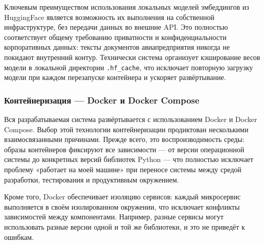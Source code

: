 Ключевым преимуществом использования локальных моделей эмбеддингов из HuggingFace является возможность их выполнения на собственной инфраструктуре, без передачи данных во внешние API. Это полностью соответствует общему требованию приватности и конфиденциальности корпоративных данных: тексты документов авиапредприятия никогда не покидают внутренний контур. Технически система организует кэширование весов модели в локальной директории \texttt{.hf\_cache}, что исключает повторную загрузку модели при каждом перезапуске контейнера и ускоряет развёртывание.

\subsubsection{Контейнеризация — Docker и Docker Compose}

Вся разрабатываемая система развёртывается с использованием Docker и Docker Compose. Выбор этой технологии контейнеризации продиктован несколькими взаимосвязанными причинами. Прежде всего, это воспроизводимость среды: образы контейнеров фиксируют все зависимости — от версии операционной системы до конкретных версий библиотек Python — что полностью исключает проблему «работает на моей машине» при переносе системы между средой разработки, тестирования и продуктивным окружением.

Кроме того, Docker обеспечивает изоляцию сервисов: каждый микросервис выполняется в своём изолированном окружении, что исключает конфликты зависимостей между компонентами. Например, разные сервисы могут использовать разные версии одной и той же библиотеки, и это не приведёт к ошибкам.